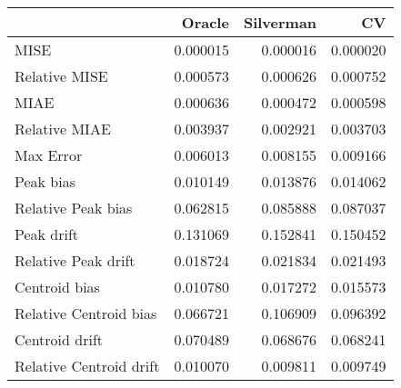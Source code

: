 \begin{tabular}{lrrr}
  \hline
 & Oracle & Silverman & CV \\ 
  \hline
MISE & 0.000015 & 0.000016 & 0.000020 \\ 
  Relative MISE & 0.000573 & 0.000626 & 0.000752 \\ 
  MIAE & 0.000636 & 0.000472 & 0.000598 \\ 
  Relative MIAE & 0.003937 & 0.002921 & 0.003703 \\ 
  Max Error & 0.006013 & 0.008155 & 0.009166 \\ 
  Peak bias & 0.010149 & 0.013876 & 0.014062 \\ 
  Relative Peak bias & 0.062815 & 0.085888 & 0.087037 \\ 
  Peak drift & 0.131069 & 0.152841 & 0.150452 \\ 
  Relative Peak drift & 0.018724 & 0.021834 & 0.021493 \\ 
  Centroid bias & 0.010780 & 0.017272 & 0.015573 \\ 
  Relative Centroid bias & 0.066721 & 0.106909 & 0.096392 \\ 
  Centroid drift & 0.070489 & 0.068676 & 0.068241 \\ 
  Relative Centroid drift & 0.010070 & 0.009811 & 0.009749 \\ 
   \hline
\end{tabular}
